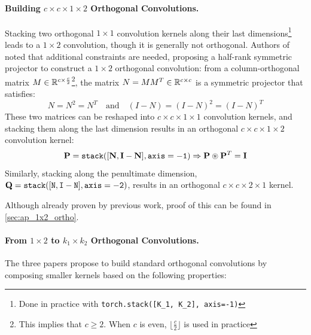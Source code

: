     \paragraph{Building $c\times c \times 1 \times 2$ Orthogonal Convolutions.}
    Stacking two orthogonal $1\times 1$ convolution kernels along their last dimensions\footnote{Done in practice with \texttt{torch.stack([K\_1, K\_2], axis=-1)}} leads to a $1 \times 2$ convolution, though it is generally not orthogonal. Authors of \cite{xiao_dynamical_2018, su_scaling-up_2021} noted that additional constraints are needed, proposing a half-rank symmetric projector to construct a $1 \times 2$ orthogonal convolution: from a column-orthogonal matrix $M \in \mathbb{R}^{c \times \frac{c}{2}}$\footnote{This implies that $c\geq2$. When $c$ is even, $\lfloor\frac{c}{2}\rfloor$ is used in practice}, the matrix $N = M M^T \in \mathbb{R}^{c \times c}$ is a symmetric projector that satisfies:
        \[
            N = N^2 = N^T \quad \text{and} \quad (I - N) = (I - N)^2 = (I - N)^T
        \]
    These two matrices can be reshaped into $c \times c \times 1 \times 1$ convolution kernels, and stacking them along the last dimension results in an orthogonal $c \times c \times 1 \times 2$ convolution kernel:
        \[
        \mathbf{P} = \mathtt{stack(}[\mathbf{N}, \mathbf{I - N}]\mathtt{, axis=-1)} \Rightarrow \mathbf{P} \circledast \mathbf{P}^T = \mathbf{I}
        \]
    Similarly, stacking along the penultimate dimension, $\mathbf{Q} = \mathtt{stack([N, I - N], axis=-2)}$, results in an orthogonal $c \times c \times 2 \times 1$ kernel. 
     
    Although already proven by previous work, proof of this can be found in \cref{sec:ap_1x2_ortho}.
    
    \paragraph{From $1 \times 2$ to $k_1 \times k_2$ Orthogonal Convolutions.}  
    The three papers propose to build standard orthogonal convolutions by composing smaller kernels based on the following properties:
    

